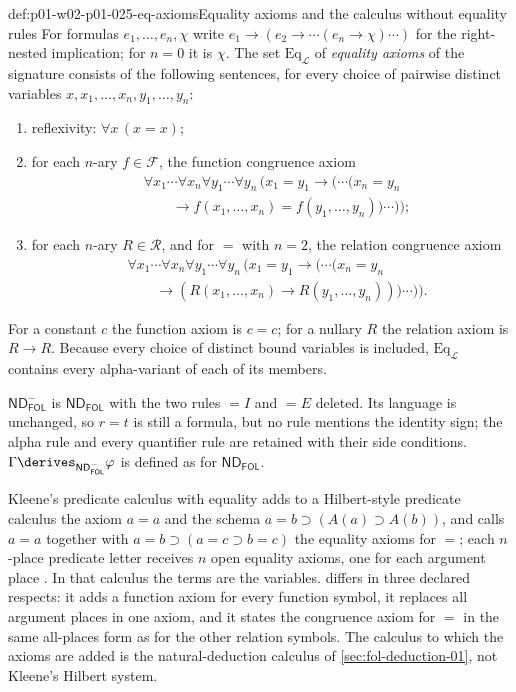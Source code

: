\begin{hbdefinition}{def:p01-w02-p01-025-eq-axioms}{Equality axioms and the calculus without equality rules}
For formulas \(e_1,\ldots,e_n,\chi\) write
\(e_1\to(e_2\to\cdots(e_n\to\chi)\cdots)\) for the right-nested
implication; for \(n=0\) it is \(\chi\).  The set
\(\mathrm{Eq}_{\mathcal L}\) of \emph{equality axioms} of the signature
consists of the following sentences, for every choice of pairwise distinct
variables \(x,x_1,\ldots,x_n,y_1,\ldots,y_n\):
\begin{enumerate}
  \item reflexivity: \(\forall x\,(x=x)\);
  \item for each \(n\)-ary \(f\in\mathcal F\), the function congruence axiom
  \[
   \begin{aligned}
   &\forall x_1\cdots\forall x_n\forall y_1\cdots\forall y_n\,
    (x_1=y_1\to(\cdots(x_n=y_n\\
   &\qquad\to f(x_1,\ldots,x_n)=f(y_1,\ldots,y_n))\cdots));
   \end{aligned}
  \]
  \item for each \(n\)-ary \(R\in\mathcal R\), and for \(=\) with \(n=2\),
  the relation congruence axiom
  \[
   \begin{aligned}
   &\forall x_1\cdots\forall x_n\forall y_1\cdots\forall y_n\,
    (x_1=y_1\to(\cdots(x_n=y_n\\
   &\qquad\to(R(x_1,\ldots,x_n)\to R(y_1,\ldots,y_n)))\cdots)).
   \end{aligned}
  \]
\end{enumerate}
For a constant \(c\) the function axiom is \(c=c\); for a nullary \(R\) the
relation axiom is \(R\to R\).  Because every choice of distinct bound
variables is included, \(\mathrm{Eq}_{\mathcal L}\) contains every
alpha-variant of each of its members.

\(\mathsf{ND}^{-}_{\mathsf{FOL}}\) is \(\mathsf{ND}_{\mathsf{FOL}}\) with
the two rules \(=I\) and \(=E\) deleted.  Its language is unchanged, so
\(r=t\) is still a formula, but no rule mentions the identity sign; the
alpha rule and every quantifier rule are retained with their side conditions.
\(\Gamma\derives_{\mathsf{ND}^{-}_{\mathsf{FOL}}}\varphi\) is defined as for
\(\mathsf{ND}_{\mathsf{FOL}}\).
\end{hbdefinition}

Kleene's predicate calculus with equality adds to a Hilbert-style predicate
calculus the axiom \(a=a\) and the schema
\(a=b\supset(A(a)\supset A(b))\), and calls \(a=a\) together with
\(a=b\supset(a=c\supset b=c)\) the equality axioms for \(=\); each
\(n\)-place predicate letter receives \(n\) open equality axioms, one for
each argument place \cite[\S 73, p.~399]{Kleene1952}.  In that calculus the
terms are the variables.   differs in
three declared respects: it adds a function axiom for every function symbol,
it replaces all argument places in one axiom, and it states the congruence
axiom for \(=\) in the same all-places form as for the other relation
symbols.  The calculus to which the axioms are added is the natural-deduction
calculus of \cref{sec:fol-deduction-01}, not Kleene's Hilbert system.


